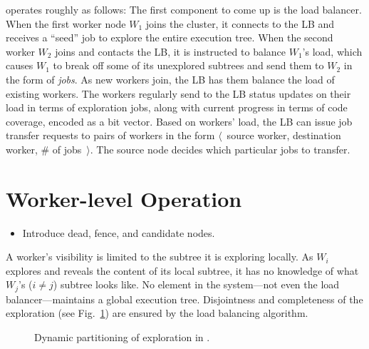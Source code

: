 \cnine operates roughly as follows: The first component to come up is the load balancer.  When the first worker node $W_1$ joins the \cnine cluster, it connects to the LB and receives a ``seed'' job to explore the entire execution tree.  When the second worker $W_2$ joins and contacts the LB, it is instructed to balance $W_1$'s load, which causes $W_1$ to break off some of its unexplored subtrees and send them to $W_2$ in the form of {\em jobs}.  As new workers join, the LB has them balance the load of existing workers.  The workers regularly send to the LB status updates on their load in terms of exploration jobs, along with current progress in terms of code coverage, encoded as a bit vector.  Based on workers' load, the LB can issue job transfer requests to pairs of workers in the form $\langle$~source worker, destination worker, \# of jobs~$\rangle$.  The source node decides which particular jobs to transfer.


\section{Worker-level Operation}
\label{sec:workerView}

\begin{itemize}
\item Introduce dead, fence, and candidate nodes.
\end{itemize}

A worker's visibility is limited to the subtree it is exploring locally.  As $W_i$ explores and reveals the content of its local subtree, it has no knowledge of what $W_j$'s ($i\ne j$) subtree looks like.  No element in the system---not even the load balancer---maintains a global execution tree.  Disjointness and completeness 
of the exploration (see Fig.~\ref{fig:architecture}) are ensured by the load balancing algorithm.

\begin{figure}[h!]
  \centering
  \caption{Dynamic partitioning of exploration in \cnine.}
 \label{fig:architecture}
\end{figure}

\newcommand{\dead}{dead\xspace}
\newcommand{\fence}{fence\xspace}
\newcommand{\candidate}{candidate\xspace}
\newcommand{\virtual}{virtual\xspace}
\newcommand{\materialized}{materialized\xspace}

